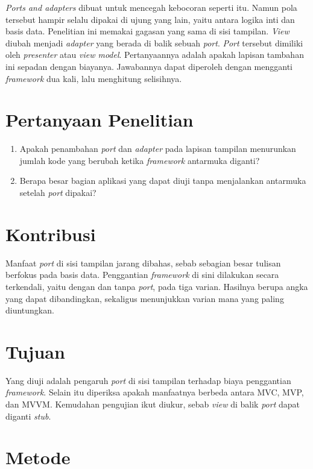 \documentclass[11pt,a4paper]{article}
\begin{document}
\textit{Ports and adapters} dibuat untuk mencegah kebocoran seperti itu. Namun pola tersebut hampir selalu dipakai di ujung yang lain, yaitu antara logika inti dan basis data. Penelitian ini memakai gagasan yang sama di sisi tampilan. \textit{View} diubah menjadi \textit{adapter} yang berada di balik sebuah \textit{port}. \textit{Port} tersebut dimiliki oleh \textit{presenter} atau \textit{view model}. Pertanyaannya adalah apakah lapisan tambahan ini sepadan dengan biayanya. Jawabannya dapat diperoleh dengan mengganti \textit{framework} dua kali, lalu menghitung selisihnya.

\section{Pertanyaan Penelitian}

\begin{enumerate}[label=\textbf{Pertanyaan \arabic*.}, leftmargin=*, labelsep=0.5em]
  \item Apakah penambahan \textit{port} dan \textit{adapter} pada lapisan tampilan menurunkan jumlah kode yang berubah ketika \textit{framework} antarmuka diganti?
  \item Berapa besar bagian aplikasi yang dapat diuji tanpa menjalankan antarmuka setelah \textit{port} dipakai?
\end{enumerate}

\section{Kontribusi}

Manfaat \textit{port} di sisi tampilan jarang dibahas, sebab sebagian besar tulisan berfokus pada basis data. Penggantian \textit{framework} di sini dilakukan secara terkendali, yaitu dengan dan tanpa \textit{port}, pada tiga varian. Hasilnya berupa angka yang dapat dibandingkan, sekaligus menunjukkan varian mana yang paling diuntungkan.

\section{Tujuan}

Yang diuji adalah pengaruh \textit{port} di sisi tampilan terhadap biaya penggantian \textit{framework}. Selain itu diperiksa apakah manfaatnya berbeda antara MVC, MVP, dan MVVM. Kemudahan pengujian ikut diukur, sebab \textit{view} di balik \textit{port} dapat diganti \textit{stub}.

\section{Metode}
\end{document}

